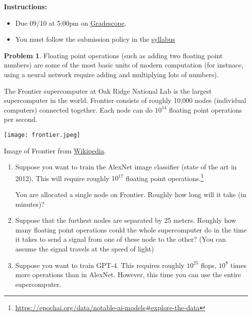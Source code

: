 \documentclass[12pt]{article}
\theoremstyle{definition}
\newtheorem{problem}{Problem}
\begin{document}
\textbf{\Large{}}
    
    \vspace{-1.8em}
    \hrulefill
 
\textbf{Instructions:}
    \begin{itemize}
        \item Due 09/10 at 5:00pm on \href{https://www.gradescope.com/courses/818054}{Gradescope}.
        \item You must follow the submission policy in the \href{https://courses.chen.pw/na_f2024/syllabus.html}{syllabus} 
\end{itemize}

\vfill
\begin{problem}
    Floating point operations (such as adding two floating point numbers) are some of the most basic units of modern computation (for instnace, using a neural network require adding and multiplying lots of numbers).

    The Frontier supercomputer at Oak Ridge National Lab is the largest supercomputer in the world.
    Frontier consists of roughly 10,000 nodes (individual computers) connected together.
    Each node can do $10^{14}$ floating point operations per second.

    \begin{center}
        \texttt{[image: frontier.jpeg]}
        
        Image of Frontier from \href{https://en.wikipedia.org/wiki/Frontier_(supercomputer)}{Wikipedia}.
    \end{center}
    \begin{enumerate}            
        \item 
            Suppose you want to train the AlexNet image classifier (state of the art in 2012).
            This will require roughly $10^{17}$ floating point operations.\footnote{\protect\url{https://epochai.org/data/notable-ai-models\#explore-the-data}}
            
            You are allocated a single node on Frontier.            
            Roughly how long will it take (in minutes)?
        \item 
            Suppose that the furthest nodes are separated by 25 meters.
            Roughly how many floating point operations could the whole supercomputer do in the time it takes to send a signal from one of these node to the other? (You can assume the signal travels at the speed of light)
        \item 
            Suppose you want to train GPT-4.
            This requires roughly $10^{25}$ flops, $10^{8}$ times more operations than in AlexNet.
            However, this time you can use the entire supercomputer.
            

\end{enumerate}
\end{problem}
\end{document}
